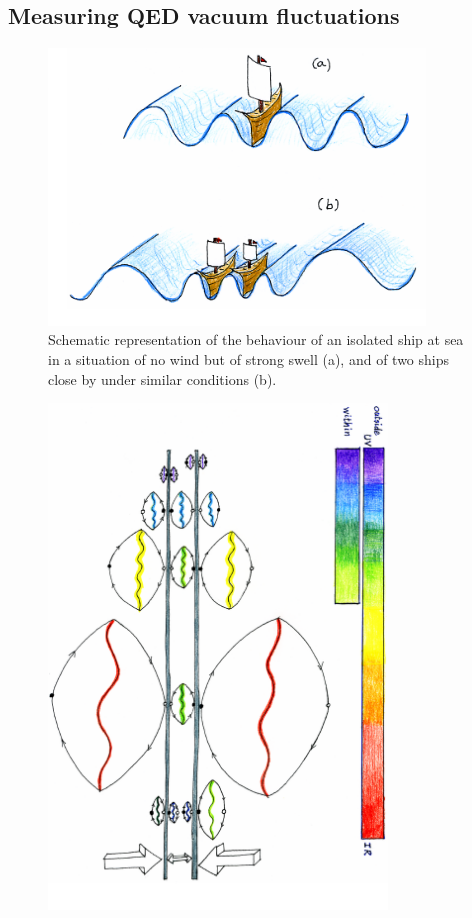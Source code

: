 \begin{subappendices}
\subsection{Measuring QED vacuum fluctuations}
\begin{figure}
\centerline{\includegraphics[width=10cm]{C8/figsC8/fig6G2.pdf}}
\caption{Schematic representation of the behaviour of an isolated ship at sea in a situation of no wind but of
strong swell (a), and of two ships close by under similar conditions (b).}\label{fig6G2}
\end{figure}
\begin{figure}
\centerline{\includegraphics[width=9cm]{C8/figsC8/fig6G3.pdf}}

\end{figure}
\end{subappendices}

